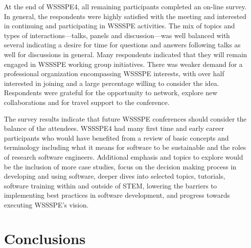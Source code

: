 \documentclass[11pt, oneside]{amsart}
\begin{document}
At the end of WSSSPE4, all remaining participants completed an on-line survey.
%
%
In general, the respondents were highly satisfied with the meeting and interested in continuing and participating in WSSSPE activities.
The mix of topics and types of interactions---talks, panels and discussion---was well balanced with several indicating a desire for time for questions and answers following talks as well for discussions in general.
Many respondents indicated that they will remain engaged in WSSSPE working group initiatives.
There was weaker demand for a professional organization encompassing WSSSPE interests, with over half interested in joining and a large percentage willing to consider the idea.
Respondents were grateful for the opportunity to network, explore new collaborations and for travel support to the conference.

The survey results indicate that future WSSSPE conferences should consider the balance of the attendees.
WSSSPE4 had many first time and early career participants who would have benefited from a review of basic concepts and terminology including what it means for software to be sustainable and the roles of research software engineers.
Additional emphasis and topics to explore would be the inclusion of more case studies, focus on the decision making process in developing and using software, deeper dives into selected topics, tutorials, software training within and outside of STEM, lowering the barriers to implementing best practices in software development, and progress towards executing WSSSPE's vision.

\section{Conclusions} \label{sec:conclusions}
\end{document}
